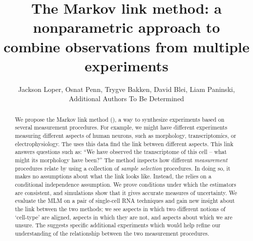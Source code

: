 \usepackage{cancel}


\title{The Markov link method: a nonparametric approach to combine observations from multiple experiments}
\author{Jackson Loper, Osnat Penn, Trygve Bakken, David Blei, Liam Paninski, \\Additional Authors To Be Determined}

\usepackage{amsthm}
\newtheorem{thm}{Theorem}
\newtheorem{lem}{Lemma}
\newtheorem{conj}{Conjecture}

\theoremstyle{definition}
\newtheorem{example}{Example}
\newtheorem{definition}{Definition}


\maketitle

\begin{abstract}
We propose the Markov link method (\MLM), a way to synthesize experiments based on several measurement procedures.  For example, we might have different experiments measuring different aspects of human neurons, such as morphology, transcriptomics, or electrophysiology.  The \MLM{} uses this data find the  link between different aspects.  This link answers questions such as: ``We have observed the transcriptome of this cell -- what might its morphology have been?'' The method inspects how different \emph{measurement} procedures relate by using a collection of \emph{sample selection} procedures.   In doing so, it makes no assumptions about what the link looks like.  Instead, the \MLM{} relies on a conditional independence assumption.  We prove conditions under which the \MLM{} estimators are consistent, and simulations show that it gives accurate measures of uncertainty.  We evaluate the MLM on a pair of single-cell RNA techniques and gain new insight about the link between the two methods; we see aspects in which two different notions of `cell-type' are aligned, aspects in which they are not, and aspects about which we are unsure.  The \MLM{} suggests specific additional experiments which would help refine our understanding of the relationship between the two measurement procedures.
\end{abstract}

